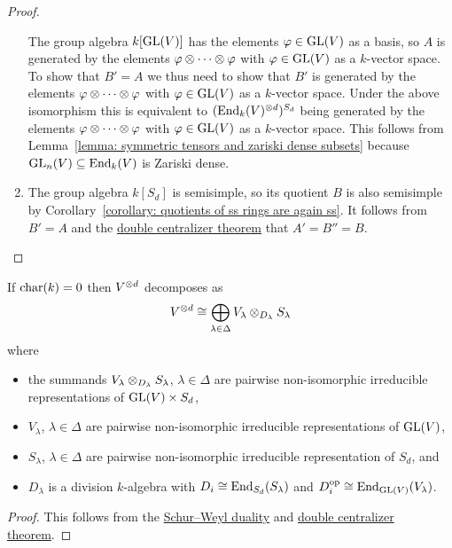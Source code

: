 \begin{proof}
\begin{enumerate}
      The group algebra $k[\operatorname{GL}(V)]$ has the elements $\varphi \in \operatorname{GL}(V)$ as a basis, so $A$ is generated by the elements $\varphi \mathbin{\otimes} \dotsb \mathbin{\otimes} \varphi$ with $\varphi \in \operatorname{GL}(V)$ as a $k$-vector space.
      To show that $B' = A$ we thus need to show that $B'$ is generated by the elements $\varphi \mathbin{\otimes} \dotsb \mathbin{\otimes} \varphi$ with $\varphi \in \operatorname{GL}(V)$ as a $k$-vector space.
      Under the above isomorphism this is equivalent to $(\operatorname{End}_k(V)^{\mathbin{\otimes} d})^{S_d}$ being generated by the elements $\varphi \mathbin{\otimes} \dotsb \mathbin{\otimes} \varphi$ with $\varphi \in \operatorname{GL}(V)$ as a $k$-vector space.
      This follows from Lemma~\ref{lemma: symmetric tensors and zariski dense subsets} because $\operatorname{GL}_n(V) \subseteq \operatorname{End}_k(V)$ is Zariski dense.
    \item
      The group algebra $k[S_d]$ is semisimple, so its quotient $B$ is also semisimple by Corollary~\ref{corollary: quotients of ss rings are again ss}.
      It follows from $B' = A$ and the \hyperref[corollary: special double centralizer theorem]{double centralizer theorem} that $A' = B'' = B$.
    \qedhere
  \end{enumerate}
\end{proof}


\begin{corollary}
  If $\operatorname{char}(k) = 0$ then $V^{\mathbin{\otimes} d}$ decomposes as
  \[
          V^{\mathbin{\otimes} d}
    \cong \bigoplus_{\lambda \in \Delta} V_\lambda \mathbin{\otimes}_{D_\lambda} S_\lambda
  \]
  where
  \begin{itemize}
    \item
      the summands $V_\lambda \mathbin{\otimes}_{D_\lambda} S_\lambda$, $\lambda \in \Delta$ are pairwise non-isomorphic irreducible representations of $\operatorname{GL}(V) \times S_d$,
    \item
      $V_\lambda$, $\lambda \in \Delta$ are pairwise non-isomorphic irreducible representations of $\operatorname{GL}(V)$,
    \item
      $S_\lambda$, $\lambda \in \Delta$ are pairwise non-isomorphic irreducible representation of $S_d$, and
    \item
      $D_\lambda$ is a division $k$-algebra with $D_i \cong \operatorname{End}_{S_d}(S_\lambda)$ and $D_i^{\operatorname{op}} \cong \operatorname{End}_{\operatorname{GL}(V)}(V_\lambda)$.
  \end{itemize}
\end{corollary}


\begin{proof}
  This follows from the \hyperref[theorem: schur weyl duality]{Schur--Weyl duality} and \hyperref[corollary: special double centralizer theorem]{double centralizer theorem}.
\end{proof}


